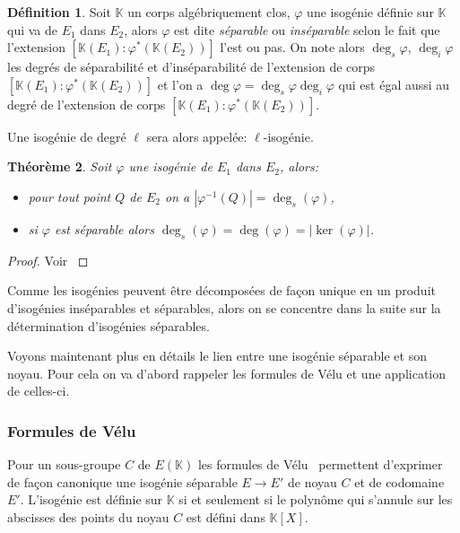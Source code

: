 \documentclass[10pt,a4paper]{book}
\theoremstyle{plain}
\newtheorem{thm}{Théorème}[chapter]
\theoremstyle{definition}
\theoremstyle{definition}
\theoremstyle{definition}
\theoremstyle{definition}
\theoremstyle{definition}
\newtheorem{defi}[thm]{Définition}
\theoremstyle{remark}
\theoremstyle{remark}
\theoremstyle{definition}
\begin{document}
\begin{defi}
Soit $\mathbb{K}$ un corps algébriquement clos, $\varphi$ une isogénie définie sur $\mathbb{K}$ qui va de $E_1$ dans $E_2$, alors $\varphi$ est dite \emph{séparable} ou \emph{inséparable} selon le fait que l'extension $[\mathbb{K}(E_1):\varphi^*(\mathbb{K}(E_2))]$ l'est ou pas. On note alors \emph{$\deg_s{\varphi}$}, \emph{$\deg_i{\varphi}$} les degrés de séparabilité et d'inséparabilité de l'extension de corps $[\mathbb{K}(E_1):\varphi^*(\mathbb{K}(E_2))]$ et l'on a $\deg{\varphi}=\deg_s{\varphi}\deg_i{\varphi}$ qui est égal aussi au degré de l'extension de corps $[\mathbb{K}(E_1):\varphi^*(\mathbb{K}(E_2))]$.
\end{defi}


Une isogénie de degré $\ell$ sera alors appelée: $\ell$-isogénie.

\begin{thm}
Soit $\varphi$ une isogénie de $E_1$ dans $E_2$, alors:
\begin{itemize}
\item pour tout point $Q$ de $E_2$ on a $|\varphi^{-1}(Q)|=\deg_s(\varphi)$,
\item si $\varphi$ est séparable alors $\deg_s(\varphi)=\deg(\varphi)=|\ker(\varphi)|$.
\end{itemize}
\end{thm}

\begin{proof}
Voir \cite[III.4.10]{Silv1}
\end{proof}

Comme les isogénies peuvent être décomposées de façon unique en un produit 
d'isogénies inséparables et séparables, alors on se concentre dans la suite sur la
détermination d'isogénies séparables.

Voyons maintenant plus en détails le lien entre une isogénie séparable et son 
noyau. Pour cela on va d'abord rappeler les formules de Vélu et une application
de celles-ci.

\subsubsection{Formules de Vélu}
\label{sse:Vel}
Pour un sous-groupe $C$ de $E(\mathbb{K})$ les formules de Vélu~\cite{velu1971} permettent d'exprimer de façon canonique une isogénie séparable $E \rightarrow E'$ de noyau $C$ et de codomaine $E'$.  L'isogénie est définie sur $\mathbb{K}$ si et seulement si le polynôme qui s'annule sur les abscisses des points du noyau $C$ est défini dans $\mathbb{K}[X]$.
\end{document}
